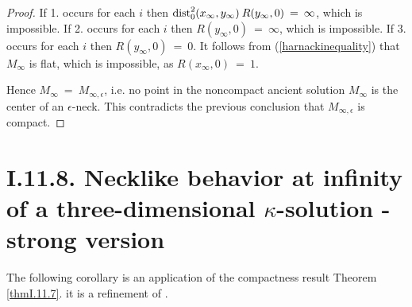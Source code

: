 \begin{proof}
If 1. occurs for each $i$ then $\operatorname{dist}_0^2(x_\infty, y_\infty) \:
R(y_\infty, 0) \: = \: \infty$, which is impossible.
If 2. occurs for each $i$ then $R(y_\infty, 0) \: = \: \infty$, which
is impossible.
If 3. occurs for each $i$ then $R(y_\infty, 0) \: = \: 0$.
It follows from (\ref{harnackinequality}) that $M_\infty$ is flat,
which is impossible, as $R(x_\infty, 0) \: = \: 1$.

Hence $M_\infty \: = \: M_{\infty,\epsilon}$, i.e. no point in the
noncompact ancient solution $M_\infty$ is the center of an $\epsilon$-neck.
This contradicts the previous conclusion that
$M_{\infty,\epsilon}$ is compact.
\end{proof}

\section{I.11.8. Necklike behavior at infinity of a three-dimensional
$\kappa$-solution - strong version}
\label{strongversion}

The following corollary is an application of the compactness result
Theorem \ref{thmI.11.7}.
it is a refinement of
\cite[Cor. I.11.8]{Perelman}.

